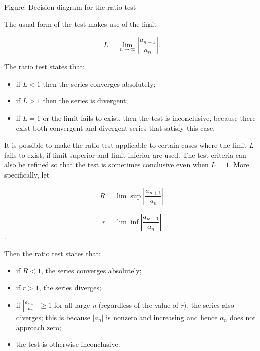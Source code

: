 


Figure: Decision diagram for the ratio test



The usual form of the test makes use of the limit



$$L = \lim _{n\to\infty}\left|\frac{a _{n+1}}{a _n}\right|.$$



The ratio test states that:



\begin{itemize}
    \item if $L < 1$ then the series converges absolutely;
    \item if $L > 1$ then the series is divergent;
    \item if $L = 1$ or the limit fails to exist, then the test is inconclusive, because there exist both convergent and divergent series that satisfy this case.
\end{itemize}

It is possible to make the ratio test applicable to certain cases where the limit \textit{L} fails to exist, if limit superior and limit inferior are used. The test criteria can also be refined so that the test is sometimes conclusive even when $L = 1$. More specifically, let



$$R = \lim\sup \left|\frac{a _{n+1}}{a _n}\right|$$



$$r = \lim\inf \left|\frac{a _{n+1}}{a _n}\right|$$.



Then the ratio test states that:



\begin{itemize}
    \item if $R < 1$, the series converges absolutely;
    \item if $r > 1$, the series diverges;
    \item if $\left|\frac{a _{n+1}}{a _n}\right|\ge 1$ for all large \textit{n} (regardless of the value of \textit{r}), the series also diverges; this is because $|a _n|$ is nonzero and increasing and hence $a _n$ does not approach zero;
    \item the test is otherwise inconclusive.
\end{itemize}


